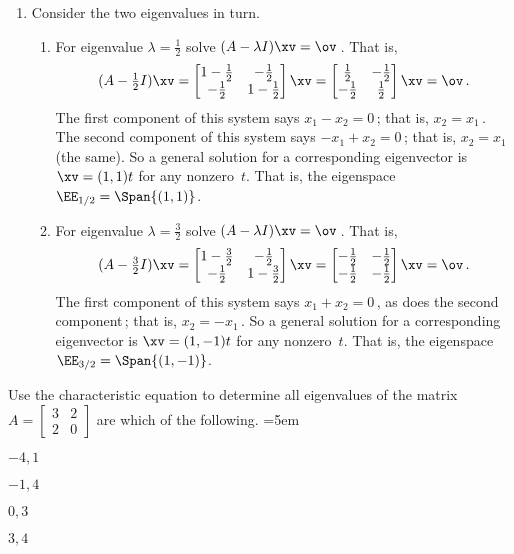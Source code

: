 \begin{example}
\begin{solution}
\begin{enumerate}
\item Consider the two eigenvalues in turn.
\begin{enumerate}
\item For eigenvalue \(\lambda=\frac12\) solve \((A-\lambda I)\xv=\ov\)\,.  That is,
\begin{equation*}
(A-\tfrac12I)\xv
=\begin{bmatrix} 1-\frac12&-\frac12\\
-\frac12&1-\frac12 \end{bmatrix}\xv
=\begin{bmatrix} \frac12&-\frac12\\
-\frac12&\frac12 \end{bmatrix}\xv
=\ov\,.
\end{equation*}
The first component of this system says \(x_1-x_2=0\)\,; that is, \(x_2=x_1\)\,.  
The second component of this system says \(-x_1+x_2=0\)\,; that is, \(x_2=x_1\) (the same).  
So a general solution for a corresponding eigenvector is \(\xv=(1,1)t\) for any nonzero~\(t\).
That is, the eigenspace \(\EE_{1/2}=\Span \{(1,1)\}\).
\item For eigenvalue \(\lambda=\frac32\) solve \((A-\lambda I)\xv=\ov\)\,.  That is,
\begin{equation*}
(A-\tfrac32I)\xv
=\begin{bmatrix} 1-\frac32&-\frac12\\
-\frac12&1-\frac32 \end{bmatrix}\xv
=\begin{bmatrix} -\frac12&-\frac12\\
-\frac12&-\frac12 \end{bmatrix}\xv
=\ov\,.
\end{equation*}
The first component of this system says \(x_1+x_2=0\)\,, as does the second component\,; that is, \(x_2=-x_1\)\,.  
So a general solution for a corresponding eigenvector is \(\xv=(1,-1)t\) for any nonzero~\(t\).
That is, the eigenspace \(\EE_{3/2}=\Span \{(1,-1)\}\).
\end{enumerate}
\end{enumerate}
\end{solution}
\end{example}




\begin{activity}
Use the characteristic equation to determine all eigenvalues of the matrix \(A=\begin{bmatrix} 3&2\\2&0 \end{bmatrix}\) are which of the following.
\partswidth=5em
\begin{parts}
\item \(-4,1\)
\item \(-1,4\)\actans
\item \(0,3\)
\item \(3,4\)
\end{parts}
\end{activity}




